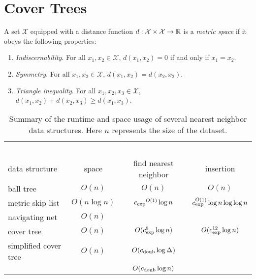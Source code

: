 \documentclass[../main.tex]{subfiles}
\newcommand{\set}[1]{\mathcal {#1}}
\newcommand{\dist}[2]{\distf({#1},{#2})}
\newcommand{\distf}{d}
\newcommand{\aspect}[1]{\Delta_{#1}}
\newcommand{\cexp}{c_\textnormal{exp}}
\newcommand{\cdoub}{c_\textnormal{doub}}
\begin{document}
\chapter{Cover Trees}

\begin{definition}
    A set $\set X$ equipped with a distance function $\distf : \set X \times \set X \to \R$ is a \emph{metric space} if it obeys the following properties:
    \begin{enumerate}
        \item \emph{Indiscernability}.  For all $x_1,x_2\in\set X$, $\dist{x_1}{x_2} = 0$ if and only if $x_1=x_2$.
        \item \emph{Symmetry}. For all $x_1,x_2\in\set X$, $\dist{x_1}{x_2} = \dist{x_2}{x_2}$.
        \item \emph{Triangle inequality}.  For all $x_1,x_2,x_3\in\set X$, $\dist{x_1}{x_2} + \dist{x_2}{x_3}\ge\dist{x_1}{x_3}$.
    \end{enumerate}
\end{definition}

\begin{table}[H]
    \small
    \centering
    \begin{tabular}{lccc}
        \toprule
        \vspace{-0.25in}
        &~\hspace{1.2in}~&~\hspace{1.2in}~&~\hspace{1.2in}~\\
        data structure & space & find nearest neighbor & insertion \\
        \midrule
        ball tree \cite{} & $O(n)$ & $O(n)$ & $O(n)$ \\
        metric skip list \cite{karger2002finding} & $O(n\log n)$ & $\cexp{}^{O(1)}\log n$ & $\cexp^{O(1)}\log n\log\log n$ \\
        navigating net \cite{} & $O(n)$ \\
        cover tree \cite{} & $O(n)$ & $O(\cexp^8\log n)$ & $O(\cexp^{12}\log n)$ \\
        simplified cover tree & $O(n)$ & $O(\cdoub{}\log \aspect{})$ \\
                              &        & $O(\cdoub{}\log n)$ \\
        \bottomrule
    \end{tabular}
    \caption{
        Summary of the runtime and space usage of several nearest neighbor data structures.
        Here $n$ represents the size of the dataset.
    }
\end{table}
\end{document}
